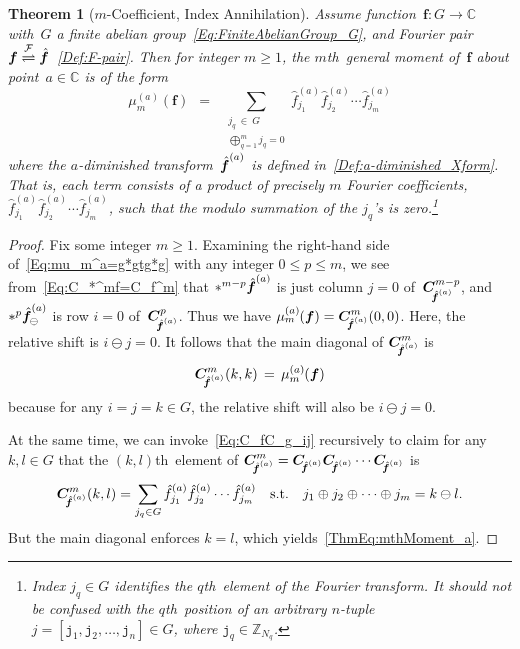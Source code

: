 \documentclass[letterpaper,11pt]{article}
\newcommand{\bs}[1]{{\boldsymbol{#1}}}
\newcommand{\gr}[1]{( #1 )}
\newcommand{\vect}[1]{[ #1 ]}
\newcommand{\C}{\mathbb C}
\newcommand{\Int}{\mathbb Z}
\newcommand{\conv}{\ast}
\newcommand{\dimin}[2]{{ #1 }^{\gr{#2}}}
\newcommand{\bcode}[1]{\texttt{#1}}
\newcommand{\hatbsf}{{\kern+0.25em}\hat{{\kern-0.25em}\bs{f}}}
\newcommand{\mth}{$m$th}
\newcommand{\qth}{$q$th}
\newcommand{\klth}{$(k,l)$th}
\newtheorem{thm}{Theorem}[section]
\theoremstyle{definition} \newtheorem{remark}{Remark}
\begin{document}
\begin{thm}[$m$-Coefficient, Index Annihilation] \label{Thm:mthMoment_a}
Assume function~$\bs{f}:G\rightarrow\C$ with~$G$ a finite abelian group~\eqref{Eq:FiniteAbelianGroup_G}, and Fourier pair $\bs{f} \stackrel{\mathcal{F}}\rightleftharpoons \hatbsf$~\eqref{Def:F-pair}. Then for integer $m\geq1$, the \mth\ general moment of~$\bs{f}$ about point~$a\in\C$ is of the form
\begin{equation} \label{ThmEq:mthMoment_a}
\dimin{\mu}{a}_m\gr{\bs{f}}
\,\;=\;\; \!\!\sum_{\substack{j_q\:\!\in\:\!G\\[2pt]
\bigoplus_{q=1}^m j_q = 0}} \dimin{\hat{f}}{a}_{j_1} \dimin{\hat{f}}{a}_{j_2} \cdots \dimin{\hat{f}}{a}_{j_m}
\end{equation}
where the $a$-diminished transform~$\dimin{\hatbsf}{a}$
is defined in~\eqref{Def:a-diminished_Xform}.
That is, each term consists of a product of precisely $m$ Fourier coefficients, $\dimin{\hat{f}}{a}_{j_1} \dimin{\hat{f}}{a}_{j_2} \cdots \dimin{\hat{f}}{a}_{j_m}$, such that the modulo summation of the ${j_q}$'s is zero.\footnote{Index $j_q\in G$ identifies the \qth\ element of the Fourier transform. It should not be confused with the \qth\ position of an arbitrary $n$-tuple $j = \vect{\bcode{j}_1,\bcode{j}_2,\ldots,\bcode{j}_n} \in G$, where $\bcode{j}_q\in\Int_{N_q}$.}
\end{thm}

\begin{proof}
Fix some integer $m\geq1$. Examining the right-hand side of~\eqref{Eq:mu_m^a=g*gtg*g} with any integer $0\leq p\leq m$, we see from~\eqref{Eq:C_*^mf=C_f^m} that $\conv^{m-p} \dimin{\hatbsf}{a}$ is just column $j=0$ of~$\bs{C}_{\!\!\dimin{\hatbsf}{a}}^{m-p}$, and $\conv^p \dimin{\hatbsf}{a}_{\!\ominus}$ is row $i=0$ of~$\bs{C}_{\!\!\dimin{\hatbsf}{a}}^{p}$. Thus we have $\dimin{\mu}{a}_m\;\!\!\gr{\bs{f}} = \bs{C}_{\!\!\dimin{\hatbsf}{a}}^m \gr{0,0}$.
Here, the relative shift is $i \ominus j=0$.
It follows that the main diagonal of $\bs{C}_{\!\!\dimin{\hatbsf}{a}}^m$ is
\begin{equation} \label{Eq:C_fC_f_kk-mu_m}
\bs{C}_{\!\!\dimin{\hatbsf}{a}}^m \gr{k,k} \,=\, \dimin{\mu}{a}_m\;\!\!\gr{\bs{f}}
\end{equation}
because for any $i=j=k\in G$, the relative shift will also be $i \ominus j=0$.

At the same time, we can invoke~\eqref{Eq:C_fC_g_ij} recursively to claim for any $k,l\in G$ that the \klth\ element of $\bs{C}_{\!\!\dimin{\hatbsf}{a}}^m = \bs{C}_{\!\!\dimin{\hatbsf}{a}}\bs{C}_{\!\!\dimin{\hatbsf}{a}}\cdots\bs{C}_{\!\!\dimin{\hatbsf}{a}}$ is
$$
\bs{C}_{\!\!\dimin{\hatbsf}{a}}^m \gr{k,l} = \sum_{j_q\in G} \hat{f}_{j_1}^{\gr{a}} \hat{f}_{j_2}^{\gr{a}} \cdots \hat{f}_{j_m}^{\gr{a}} \quad \text{s.t.} \quad j_1 \oplus j_2 \oplus \cdots \oplus j_m = k \ominus l.
$$
But the main diagonal enforces $k=l$, which yields~\eqref{ThmEq:mthMoment_a}.
\end{proof}
\end{document}
